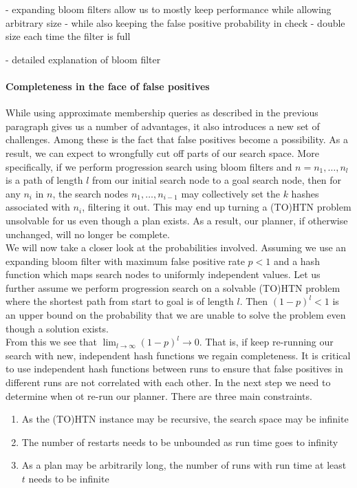 - expanding bloom filters allow us to mostly keep performance while allowing arbitrary size
- while also keeping the false positive probability in check
- double size each time the filter is full

- detailed explanation of bloom filter

\paragraph{Completeness in the face of false positives}
While using approximate membership queries as described in the previous paragraph gives us a number of advantages, it also introduces a new set of challenges. Among these is the fact that false positives become a possibility. As a result, we can expect to wrongfully cut off parts of our search space. More specifically, if we perform progression search using bloom filters and $n = n_1, \ldots, n_l$ is a path of length $l$ from our initial search node to a goal search node, then for any $n_i$ in $n$, the search nodes $n_1, \ldots, n_{i-1}$ may collectively set the $k$ hashes associated with $n_i$, filtering it out. This may end up turning a (TO)HTN problem unsolvable for us even though a plan exists. As a result, our planner, if otherwise unchanged, will no longer be complete. \\
We will now take a closer look at the probabilities involved. Assuming we use an expanding bloom filter with maximum false positive rate $p < 1$ and a hash function which maps search nodes to uniformly independent values. Let us further assume we perform progression search on a solvable (TO)HTN problem where the shortest path from start to goal is of length $l$. Then $(1 - p)^l < 1$ is an upper bound on the probability that we are unable to solve the problem even though a solution exists. \\
From this we see that $\lim_{l \rightarrow \infty} (1 - p)^l \rightarrow 0$. That is, if keep re-running our search with new, independent hash functions we regain completeness. It is critical to use independent hash functions between runs to ensure that false positives in different runs are not correlated with each other. In the next step we need to determine when ot re-run our planner. There are three main constraints.
\begin{enumerate}
	\item As the (TO)HTN instance may be recursive, the search space may be infinite
	\item The number of restarts needs to be unbounded as run time goes to infinity
	\item As a plan may be arbitrarily long, the number of runs with run time at least $t$ needs to be infinite
\end{enumerate}
